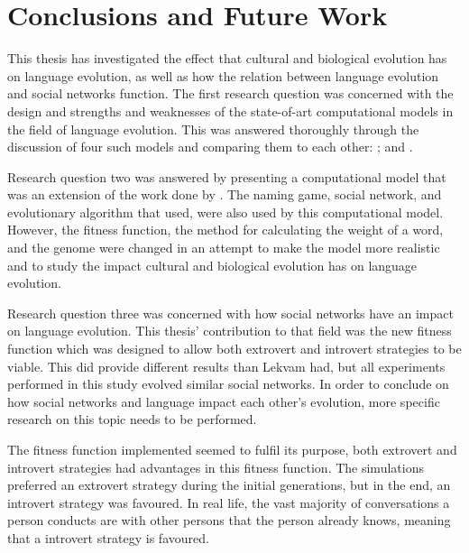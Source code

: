 \acresetall
\chapter{Conclusions and Future Work}\label{ch:Conclusion}

This thesis has investigated the effect that cultural and biological evolution has on language evolution, as well as how the relation between language evolution and social networks function. The first research question was concerned with the design and strengths and weaknesses of the state-of-art computational models in the field of language evolution. This was answered thoroughly through the discussion of four such models and comparing them to each other: \citet{lipowska2011naming, lekvam2014co, gong2011simulating}; and \citet{munroe2002learning}.

Research question two was answered by presenting a computational model that was an extension of the work done by \citeauthor{lekvam2014co}. The naming game, social network, and evolutionary algorithm that \citeauthor{lekvam2014co} used, were also used by this computational model. However, the fitness function, the method for calculating the weight of a word, and the genome were changed in an attempt to make the model more realistic and to study the impact cultural and biological evolution has on language evolution. 

Research question three was concerned with how social networks have an impact on language evolution. This thesis' contribution to that field was the new fitness function which was designed to allow both extrovert and introvert strategies to be viable. This did provide different results than Lekvam had, but all experiments performed in this study evolved similar social networks. In order to conclude on how social networks and language impact each other's evolution, more specific research on this topic needs to be performed.
 
The fitness function implemented seemed to fulfil its purpose, both extrovert and introvert strategies had advantages in this fitness function. The simulations preferred an extrovert strategy during the initial generations, but in the end, an introvert strategy was favoured. In real life, the vast majority of conversations a person conducts are with other persons that the person already knows, meaning that a introvert strategy is favoured.
 
